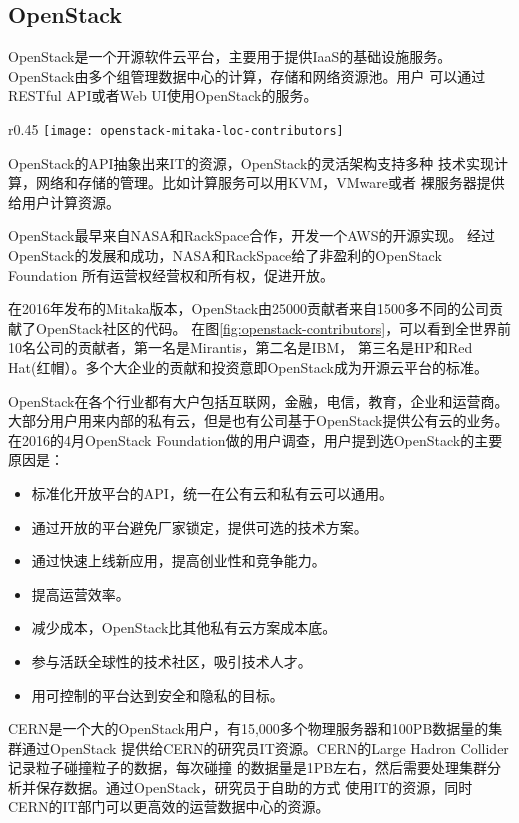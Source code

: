\subsection{OpenStack}
\label{subsubsec:openstack}
OpenStack是一个开源软件云平台，主要用于提供IaaS的基础设施服务。
OpenStack由多个组管理数据中心的计算，存储和网络资源池。用户
可以通过RESTful API或者Web UI使用OpenStack的服务。
\begin{wrapfigure}{r}{0.45\textwidth}
  \centering
    \texttt{[image: openstack-mitaka-loc-contributors]}
    \caption{OpenStack的Mitaka版本贡献者排名，按Lines of Code排序。\cite{stackalytics_mitaka_loc}}
  \label{fig:openstack-contributors}
\end{wrapfigure}
OpenStack的API抽象出来IT的资源，OpenStack的灵活架构支持多种
技术实现计算，网络和存储的管理。比如计算服务可以用KVM，VMware或者
裸服务器提供给用户计算资源。

OpenStack最早来自NASA和RackSpace合作，开发一个AWS的开源实现。
经过OpenStack的发展和成功，NASA和RackSpace给了非盈利的OpenStack Foundation
所有运营权经营权和所有权，促进开放。


在2016年发布的Mitaka版本，OpenStack由25000贡献者来自1500多不同的公司贡献了OpenStack社区的代码。\cite{stackalytics_mitaka_loc}
在图\ref{fig:openstack-contributors}，可以看到全世界前10名公司的贡献者，第一名是Mirantis，第二名是IBM，
第三名是HP和Red Hat(红帽）。多个大企业的贡献和投资意即OpenStack成为开源云平台的标准。

OpenStack在各个行业都有大户包括互联网，金融，电信，教育，企业和运营商。
大部分用户用来内部的私有云，但是也有公司基于OpenStack提供公有云的业务。
在2016的4月OpenStack Foundation做的用户调查，用户提到选OpenStack的主要原因是：
\begin{itemize}
  \item 标准化开放平台的API，统一在公有云和私有云可以通用。
  \item 通过开放的平台避免厂家锁定，提供可选的技术方案。
  \item 通过快速上线新应用，提高创业性和竞争能力。
  \item 提高运营效率。
  \item 减少成本，OpenStack比其他私有云方案成本底。
  \item 参与活跃全球性的技术社区，吸引技术人才。
  \item 用可控制的平台达到安全和隐私的目标。
\end{itemize}
CERN是一个大的OpenStack用户，有15,000多个物理服务器和100PB数据量的集群通过OpenStack
提供给CERN的研究员IT资源。CERN的Large Hadron Collider记录粒子碰撞粒子的数据，每次碰撞
的数据量是1PB左右，然后需要处理集群分析并保存数据。通过OpenStack，研究员于自助的方式
使用IT的资源，同时CERN的IT部门可以更高效的运营数据中心的资源。\cite{cern_user_story}

